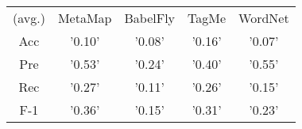 \begin{tabular}{ccccc}
(avg.) & MetaMap & BabelFly & TagMe & WordNet\\ 
Acc & '0.10' & '0.08' & '0.16' & '0.07'\\ 
Pre & '0.53' & '0.24' & '0.40' & '0.55'\\ 
Rec & '0.27' & '0.11' & '0.26' & '0.15'\\ 
F-1 & '0.36' & '0.15' & '0.31' & '0.23'\\ 

\end{tabular}